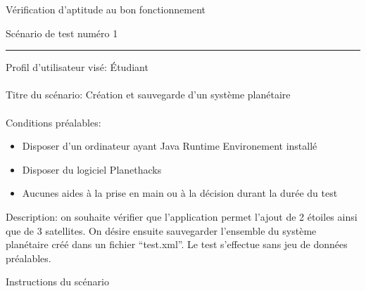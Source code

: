 \documentclass[a4paper,10pt]{article}
\begin{document}
\newpage
{}
\begin{center}
  \begin{huge}
    Vérification d'aptitude au bon fonctionnement \\
  \end{huge}
  \vspace{1cm}
  \begin{Large}
    Scénario de test numéro 1
  \end{Large}
\end{center}
\rule{\linewidth}{.5pt}
Profil d'utilisateur visé: Étudiant \\\\
Titre du scénario: Création et sauvegarde d'un système planétaire \\\\
Conditions préalables:
\begin{itemize}
 \item Disposer d'un ordinateur ayant Java Runtime Environement installé
 \item Disposer du logiciel Planethacks
 \item Aucunes aides à la prise en main ou à la décision durant la durée du test
\end{itemize}
Description: on souhaite vérifier que l'application permet l'ajout de 2 étoiles ainsi que de 3 satellites. 
On désire ensuite sauvegarder l'ensemble du système planétaire créé dans un fichier ``test.xml''.
Le test s'effectue sans jeu de données préalables.
\begin{center}
 \begin{Large}
    Instructions du scénario
  \end{Large}
\end{center}
\end{document}
